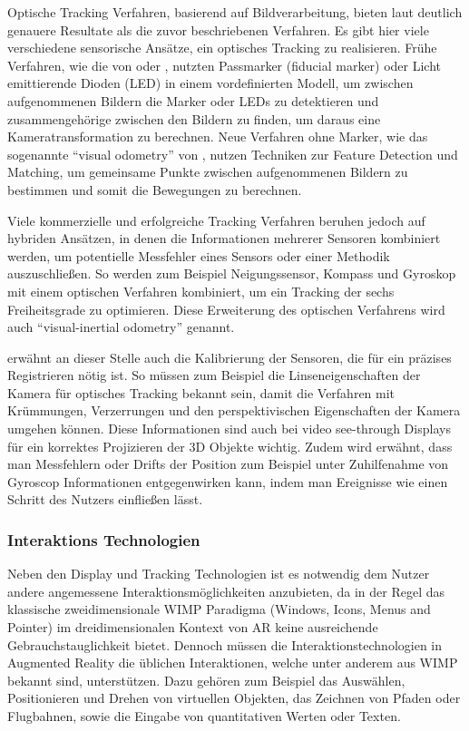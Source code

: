 Optische Tracking Verfahren, basierend auf Bildverarbeitung, bieten laut \citet{van2010survey} deutlich genauere Resultate als die zuvor beschriebenen Verfahren. Es gibt hier viele verschiedene sensorische Ansätze, ein optisches Tracking zu realisieren. Frühe Verfahren, wie die von \citet{dunston2008identification} oder \citet{narzt2006augmented}, nutzten Passmarker (fiducial marker) oder Licht emittierende Dioden (LED) in einem vordefinierten Modell, um zwischen aufgenommenen Bildern die Marker oder LEDs zu detektieren und zusammengehörige zwischen den Bildern zu finden, um daraus eine Kameratransformation zu berechnen. Neue Verfahren ohne Marker, wie das sogenannte \enquote{visual odometry} von \citet{nister2004visual}, nutzen Techniken zur Feature Detection und Matching, um gemeinsame Punkte zwischen aufgenommenen Bildern zu bestimmen und somit die Bewegungen zu berechnen.

Viele kommerzielle und erfolgreiche Tracking Verfahren beruhen jedoch auf hybriden Ansätzen, in denen die Informationen mehrerer Sensoren kombiniert werden, um potentielle Messfehler eines Sensors oder einer Methodik auszuschließen. So werden zum Beispiel Neigungssensor, Kompass und Gyroskop mit einem optischen Verfahren kombiniert, um ein Tracking der sechs Freiheitsgrade zu optimieren. Diese Erweiterung des optischen Verfahrens wird auch \enquote{visual-inertial odometry} genannt. \citep{van2010survey}

\citet{azuma2001recent} erwähnt an dieser Stelle auch die Kalibrierung der Sensoren, die für ein präzises Registrieren nötig ist. So müssen zum Beispiel die Linseneigenschaften der Kamera für optisches Tracking bekannt sein, damit die Verfahren mit Krümmungen, Verzerrungen und den perspektivischen Eigenschaften der Kamera umgehen können. Diese Informationen sind auch bei video see-through Displays für ein korrektes Projizieren der 3D Objekte wichtig. Zudem wird erwähnt, dass man Messfehlern oder Drifts der Position zum Beispiel unter Zuhilfenahme von Gyroscop Informationen entgegenwirken kann, indem man Ereignisse wie einen Schritt des Nutzers einfließen lässt. \citep{azuma2001recent} 

\subsubsection{Interaktions Technologien} \label{sec:ar-interaction}

Neben den Display und Tracking Technologien ist es notwendig dem Nutzer andere angemessene Interaktionsmöglichkeiten anzubieten, da in der Regel das klassische zweidimensionale WIMP Paradigma (Windows, Icons, Menus and Pointer) im dreidimensionalen Kontext von AR keine ausreichende Gebrauchstauglichkeit bietet. Dennoch müssen die Interaktionstechnologien in Augmented Reality die üblichen Interaktionen, welche unter anderem aus WIMP bekannt sind, unterstützen. Dazu gehören zum Beispiel das Auswählen, Positionieren und Drehen von virtuellen Objekten, das Zeichnen von Pfaden oder Flugbahnen, sowie die Eingabe von quantitativen Werten oder Texten. \citep{van2010survey} 

